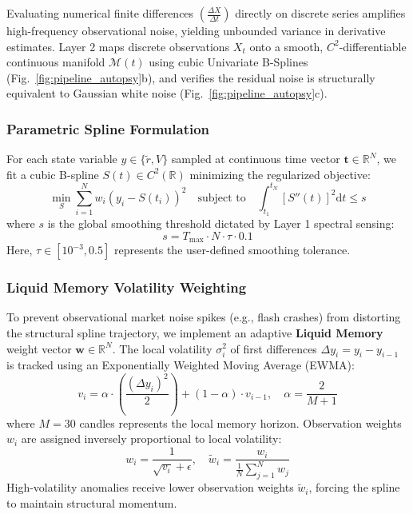 \documentclass[11pt,a4paper]{article}
\begin{document}
Evaluating numerical finite differences $(\frac{\Delta X}{\Delta t})$ directly on discrete series amplifies high-frequency observational noise, yielding unbounded variance in derivative estimates. Layer 2 maps discrete observations $X_t$ onto a smooth, $C^2$-differentiable continuous manifold $\mathcal{M}(t)$ using cubic Univariate B-Splines \cite{reinsch1967smoothing} (Fig.~\ref{fig:pipeline_autopsy}b), and verifies the residual noise is structurally equivalent to Gaussian white noise (Fig.~\ref{fig:pipeline_autopsy}c).

\subsubsection{Parametric Spline Formulation}
For each state variable $y \in \{\tilde{r}, V\}$ sampled at continuous time vector $\mathbf{t} \in \mathbb{R}^N$, we fit a cubic B-spline $S(t) \in C^2(\mathbb{R})$ minimizing the regularized objective:
\begin{equation}
    \min_{S} \sum_{i=1}^{N} w_i \left( y_i - S(t_i) \right)^2 \quad \text{subject to} \quad \int_{t_1}^{t_N} \left[ S''(t) \right]^2 \mathrm{d}t \le s
\end{equation}
where $s$ is the global smoothing threshold dictated by Layer 1 spectral sensing:
\begin{equation}
    s = T_{\text{max}} \cdot N \cdot \tau \cdot 0.1
\end{equation}
Here, $\tau \in [10^{-3}, 0.5]$ represents the user-defined smoothing tolerance.

\subsubsection{Liquid Memory Volatility Weighting}
To prevent observational market noise spikes (e.g., flash crashes) from distorting the structural spline trajectory, we implement an adaptive \textbf{Liquid Memory} weight vector $\mathbf{w} \in \mathbb{R}^N$. The local volatility $\sigma_i^2$ of first differences $\Delta y_i = y_i - y_{i-1}$ is tracked using an Exponentially Weighted Moving Average (EWMA):
\begin{equation}
    v_i = \alpha \cdot \left( \frac{(\Delta y_i)^2}{2} \right) + (1 - \alpha) \cdot v_{i-1}, \quad \alpha = \frac{2}{M + 1}
\end{equation}
where $M = 30$ candles represents the local memory horizon. Observation weights $w_i$ are assigned inversely proportional to local volatility:
\begin{equation}
    w_i = \frac{1}{\sqrt{v_i} + \epsilon}, \quad \tilde{w}_i = \frac{w_i}{\frac{1}{N}\sum_{j=1}^N w_j}
\end{equation}
High-volatility anomalies receive lower observation weights $\tilde{w}_i$, forcing the spline to maintain structural momentum.
\end{document}
